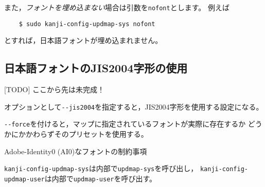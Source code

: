 \documentclass{jlreq}
\makeatletter
\def\loadprint#1{%
  \openin\xx@myread=#1\relax
  \@whilesw\unless\ifeof\xx@myread\fi{%
    \readline\xx@myread to \xx@dataline
    \expandafter\xx@striplf\xx@dataline\@nil
    \leavevmode\null\xx@dataline\par
  }%
  \closein\xx@myread
}
\def\file#1{\texttt{#1}}
\def\command#1{\texttt{#1}}
\def\option#1{\texttt{-{}-#1}}
\makeatother
\begin{document}
また，\emph{フォントを埋め込まない}場合は引数を\command{nofont}とします。
例えば
\begin{verbatim}
    $ sudo kanji-config-updmap-sys nofont
\end{verbatim}
とすれば，日本語フォントが埋め込まれません。

\subsection{日本語フォントのJIS2004字形の使用}




[TODO] ここから先は未完成！

オプションとして\option{jis2004}を指定すると，JIS2004字形を使用する設定になる。

\option{force}を付けると，マップに指定されているフォントが実際に存在するか
どうかにかかわらずそのプリセットを使用する。

Adobe-Identity0 (AI0)なフォントの制約事項

\command{kanji-config-updmap-sys}は内部で\command{updmap-sys}を呼び出し，
\command{kanji-config-updmap-user}は内部で\command{updmap-user}を呼び出す。


\clearpage

\end{document}
